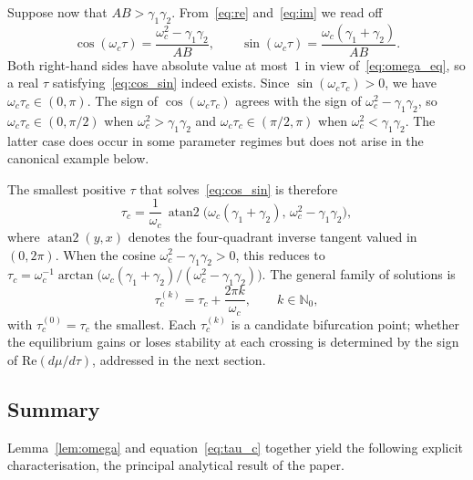 \documentclass[sn-mathphys,Numbered]{sn-jnl}
\theoremstyle{thmstyleone}
\theoremstyle{thmstyletwo}
\theoremstyle{thmstylethree}
\begin{document}
Suppose now that $AB>\gamma_1\gamma_2$. From~\eqref{eq:re} and~\eqref{eq:im}
we read off
\begin{equation}
\cos(\omega_c\tau) = \frac{\omega_c^2-\gamma_1\gamma_2}{AB},
\qquad
\sin(\omega_c\tau) = \frac{\omega_c(\gamma_1+\gamma_2)}{AB}.
\label{eq:cos_sin}
\end{equation}
Both right-hand sides have absolute value at most~$1$ in view
of~\eqref{eq:omega_eq}, so a real $\tau$ satisfying~\eqref{eq:cos_sin}
indeed exists. Since $\sin(\omega_c\tau_c)>0$, we have
$\omega_c\tau_c\in(0,\pi)$. The sign of $\cos(\omega_c\tau_c)$
agrees with the sign of $\omega_c^2-\gamma_1\gamma_2$, so
$\omega_c\tau_c\in(0,\pi/2)$ when $\omega_c^2>\gamma_1\gamma_2$ and
$\omega_c\tau_c\in(\pi/2,\pi)$ when $\omega_c^2<\gamma_1\gamma_2$.
The latter case does occur in some parameter regimes but does not arise
in the canonical example below.

The smallest positive $\tau$ that solves~\eqref{eq:cos_sin} is therefore
\begin{equation}
\tau_c
= \frac{1}{\omega_c}\,
   \operatorname{atan2}\!\bigl(\omega_c(\gamma_1+\gamma_2),\,
                                 \omega_c^2-\gamma_1\gamma_2\bigr),
\label{eq:tau_c}
\end{equation}
where $\operatorname{atan2}(y,x)$ denotes the four-quadrant inverse
tangent valued in~$(0,2\pi)$. When the cosine
$\omega_c^2-\gamma_1\gamma_2>0$, this reduces to
$\tau_c=\omega_c^{-1}\arctan\bigl(\omega_c(\gamma_1+\gamma_2)/
(\omega_c^2-\gamma_1\gamma_2)\bigr)$. The general family of solutions is
\begin{equation}
\tau_c^{(k)} = \tau_c + \frac{2\pi k}{\omega_c},
\qquad k\in\mathbb{N}_0,
\label{eq:tau_branches}
\end{equation}
with $\tau_c^{(0)}=\tau_c$ the smallest. Each $\tau_c^{(k)}$ is a candidate
bifurcation point; whether the equilibrium gains or loses stability at
each crossing is determined by the sign of $\mathrm{Re}(d\mu/d\tau)$,
addressed in the next section.

\subsection{Summary}

Lemma~\ref{lem:omega} and equation~\eqref{eq:tau_c} together yield the
following explicit characterisation, the principal analytical result of
the paper.
\end{document}
